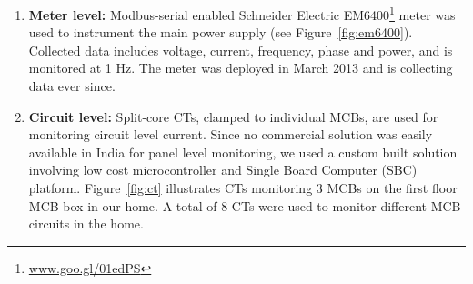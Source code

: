 \documentclass[10pt]{sensys-proc}
\newcommand{\figref}[1]{Figure~\ref{#1}}
\newcommand{\denselistbib}{
  \itemsep -.6pt\topsep-4pt\partopsep-20pt
}
\begin{document}
\begin{enumerate}[leftmargin=1em]\denselistbib
\vspace{-1.5mm}\item \textbf{Meter level:} Modbus-serial enabled Schneider Electric EM6400\footnote{\url{www.goo.gl/01edPS}} meter was used to instrument the main power supply (see \figref{fig:em6400}). %
Collected data includes voltage, current, frequency, phase and power, and is monitored at 1 Hz. The meter was deployed in March 2013 and is collecting data ever since. %

\vspace{-1.5mm} \item \textbf{Circuit level:} Split-core CTs, clamped to individual MCBs, are used for monitoring circuit level current. Since no commercial solution was easily available in India for panel level monitoring, we used a custom built solution involving low cost microcontroller and Single Board Computer (SBC) platform. %
\figref{fig:ct} illustrates CTs monitoring 3 MCBs on the first floor MCB box in our home. %
A total of 8 CTs were used to monitor different MCB circuits in the home.


\end{enumerate}
\end{document}
